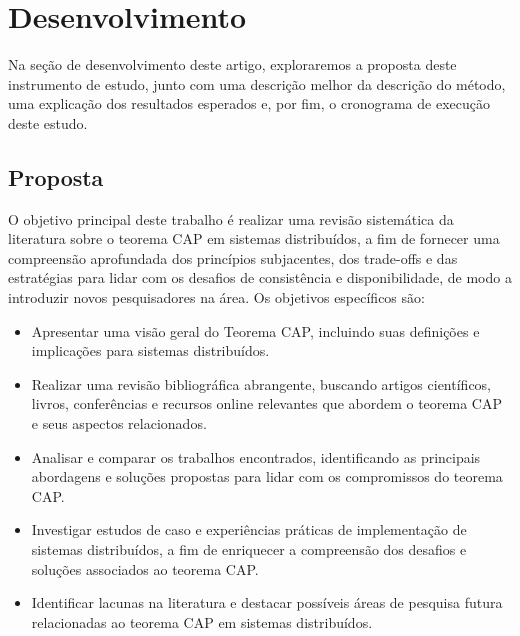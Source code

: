 \chapter{Desenvolvimento}\label{cap:proposta}
Na seção de desenvolvimento deste artigo, exploraremos a proposta deste instrumento de estudo, junto com uma descrição melhor da descrição do método, uma explicação dos resultados esperados e, por fim, o cronograma de execução deste estudo.

\section{Proposta}
O objetivo principal deste trabalho é realizar uma revisão sistemática da literatura sobre o teorema CAP em sistemas distribuídos, a fim de fornecer uma compreensão aprofundada dos princípios subjacentes, dos trade-offs e das estratégias para lidar com os desafios de consistência e disponibilidade, de modo a introduzir novos pesquisadores na área. Os objetivos específicos são:
\begin{itemize}
    \item Apresentar uma visão geral do Teorema CAP, incluindo suas definições e implicações para sistemas distribuídos.
    \item Realizar uma revisão bibliográfica abrangente, buscando artigos científicos, livros, conferências e recursos online relevantes que abordem o teorema CAP e seus aspectos relacionados.
    \item Analisar e comparar os trabalhos encontrados, identificando as principais abordagens e soluções propostas para lidar com os compromissos do teorema CAP.
    \item Investigar estudos de caso e experiências práticas de implementação de sistemas distribuídos, a fim de enriquecer a compreensão dos desafios e soluções associados ao teorema CAP.
    \item Identificar lacunas na literatura e destacar possíveis áreas de pesquisa futura relacionadas ao teorema CAP em sistemas distribuídos.
\end{itemize}

